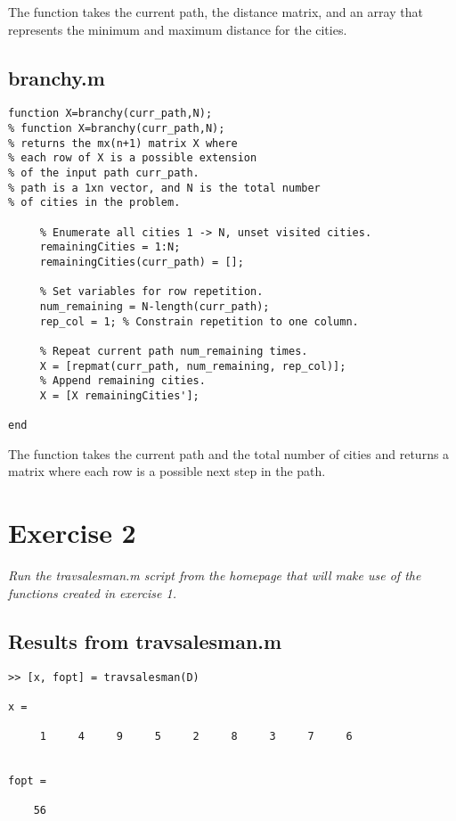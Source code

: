 \documentclass{article}
\begin{document}
  \noindent
  The function takes the current path, the distance matrix, and an array that
  represents the minimum and maximum distance for the cities.

  \newpage

  \subsection*{branchy.m}

  \begin{lstlisting}
function X=branchy(curr_path,N);
% function X=branchy(curr_path,N);
% returns the mx(n+1) matrix X where
% each row of X is a possible extension
% of the input path curr_path.
% path is a 1xn vector, and N is the total number
% of cities in the problem.

     % Enumerate all cities 1 -> N, unset visited cities.
     remainingCities = 1:N;
     remainingCities(curr_path) = [];

     % Set variables for row repetition.
     num_remaining = N-length(curr_path);
     rep_col = 1; % Constrain repetition to one column.

     % Repeat current path num_remaining times.
     X = [repmat(curr_path, num_remaining, rep_col)];
     % Append remaining cities.
     X = [X remainingCities'];

end
  \end{lstlisting}

  \noindent
  The function takes the current path and the total number of cities and
  returns a matrix where each row is a possible next step in the path. \\

\section*{Exercise 2}

  \textit{Run the travsalesman.m script from the homepage that will make
  use of the functions created in exercise 1.}

  \subsection*{Results from travsalesman.m}

  \begin{lstlisting}
>> [x, fopt] = travsalesman(D)

x =

     1     4     9     5     2     8     3     7     6


fopt =

    56
  \end{lstlisting}
\end{document}
